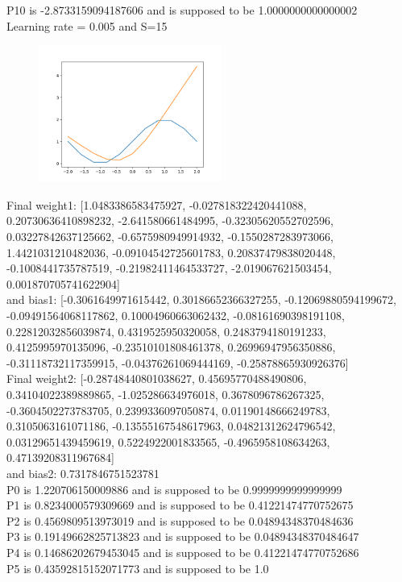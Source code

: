 \documentclass{article}
\begin{document}
P10 is -2.8733159094187606 and is supposed to be 1.0000000000000002\\
Learning rate = 0.005 and S=15\\
\begin{figure}[htp]
    \centering
    \includegraphics[width=6cm]{photos/2_005.png}
    \label{fig:2}
\end{figure}
Final weight1: [1.0483386583475927, -0.027818322420441088, 0.20730636410898232, -2.641580661484995, -0.32305620552702596, 0.03227842637125662, -0.6575980949914932, -0.1550287283973066, 1.4421031210482036, -0.09104542725601783, 0.20837479838020448, -0.1008441735787519, -0.21982411464533727, -2.019067621503454, 0.001870705741622904]\\ and bias1: [-0.3061649971615442, 0.30186652366327255, -0.12069880594199672, -0.09491564068117862, 0.10004960663062432, -0.08161690398191108, 0.22812032856039874, 0.4319525950320058, 0.2483794180191233, 0.4125995970135096, -0.23510101808461378, 0.26996947956350886, -0.31118732117359915, -0.04376261069444169, -0.25878865930926376]\\
Final weight2: [-0.28748440801038627, 0.45695770488490806, 0.34104022389889865, -1.025286634976018, 0.3678096786267325, -0.3604502273783705, 0.2399336097050874, 0.01190148666249783, 0.3105063161071186, -0.13555167548617963, 0.04821312624796542, 0.03129651439459619, 0.5224922001833565, -0.4965958108634263, 0.47139208311967684]\\ and bias2: 0.7317846751523781\\
P0 is 1.220706150009886 and is supposed to be 0.9999999999999999\\
P1 is 0.8234000579309669 and is supposed to be 0.41221474770752675\\
P2 is 0.4569809513973019 and is supposed to be 0.04894348370484636\\
P3 is 0.19149662825713823 and is supposed to be 0.04894348370484647\\
P4 is 0.14686202679453045 and is supposed to be 0.41221474770752686\\
P5 is 0.43592815152071773 and is supposed to be 1.0\\
\end{document}
